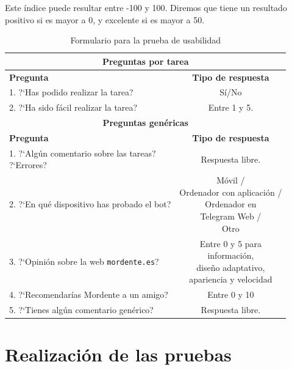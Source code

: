 Este índice puede resultar entre -100 y 100. Diremos que tiene un resultado positivo si es mayor a 0, y excelente si es mayor a 50.


\begin{table}[]
    \centering
    \begin{tabular}{|l|c|}
        \hline
        \multicolumn{2}{|c|}{\textbf{Preguntas por tarea}} \\
        \hline
        \textbf{Pregunta} & \textbf{Tipo de respuesta} \\
        \hline
        1. ?`Has podido realizar la tarea? & Sí/No \\
        \hline
        2. ?`Ha sido fácil realizar la tarea? & Entre 1 y 5. \\
        \hline
        \hline
        \multicolumn{2}{|c|}{\textbf{Preguntas genéricas}} \\
        \hline
        \textbf{Pregunta} & \textbf{Tipo de respuesta} \\
        \hline
        \makecell[l]{1. ?`Algún comentario sobre las tareas? \\?`Errores?} & Respuesta libre. \\
        \hline
        2. ?`En qué dispositivo has probado el bot? & \makecell{Móvil / \\Ordenador con aplicación / \\ Ordenador en \\Telegram Web / \\ Otro} \\
        \hline
        3. ?`Opinión sobre la web \texttt{mordente.es}? & \makecell{Entre 0 y 5 para \\ información,\\ diseño adaptativo,\\ apariencia y velocidad} \\
        \hline
        4. ?`Recomendarías Mordente a un amigo? & Entre 0 y 10 \\
        \hline
        5. ?`Tienes algún comentario genérico? & Respuesta libre. \\
        \hline
    \end{tabular}
    \caption{Formulario para la prueba de usabilidad}
    \label{tab:preguntasPrueba}
\end{table}

\section{Realización de las pruebas}

